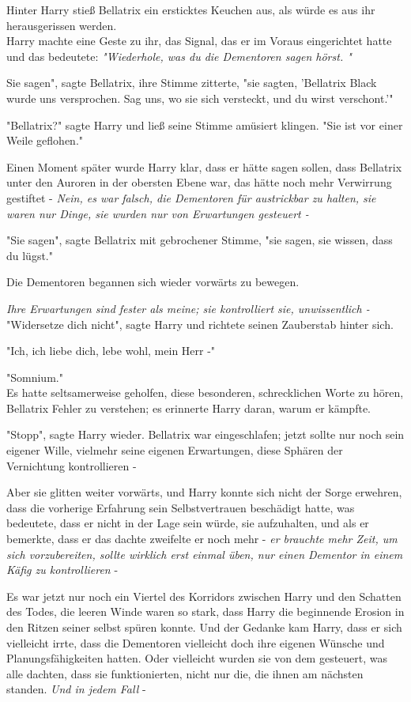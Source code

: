 {Hinter Harry stieß Bellatrix ein ersticktes Keuchen aus, als würde es aus ihr herausgerissen werden.\\ Harry machte eine Geste zu ihr, das Signal, das er im Voraus eingerichtet hatte und das bedeutete: \emph{"Wiederhole, was du die Dementoren sagen hörst. "}

Sie sagen", sagte Bellatrix, ihre Stimme zitterte, "sie sagten, 'Bellatrix Black wurde uns versprochen. Sag uns, wo sie sich versteckt, und du wirst verschont.'"

"Bellatrix?" sagte Harry und ließ seine Stimme amüsiert klingen. "Sie ist vor einer Weile geflohen."

Einen Moment später wurde Harry klar, dass er hätte sagen sollen, dass Bellatrix unter den Auroren in der obersten Ebene war, das hätte noch mehr Verwirrung gestiftet - \emph{Nein, es war falsch, die Dementoren für austrickbar zu halten, sie waren nur Dinge, sie wurden nur von Erwartungen gesteuert -}

"Sie sagen", sagte Bellatrix mit gebrochener Stimme, "sie sagen, sie wissen, dass du lügst."

Die Dementoren begannen sich wieder vorwärts zu bewegen.

\emph{Ihre Erwartungen sind fester als meine; sie kontrolliert sie, unwissentlich -}\\ "Widersetze dich nicht", sagte Harry und richtete seinen Zauberstab hinter sich.

"Ich, ich liebe dich, lebe wohl, mein Herr -"

"Somnium."\\ Es hatte seltsamerweise geholfen, diese besonderen, schrecklichen Worte zu hören, Bellatrix Fehler zu verstehen; es erinnerte Harry daran, warum er kämpfte.

"Stopp", sagte Harry wieder. Bellatrix war eingeschlafen; jetzt sollte nur noch sein eigener Wille, vielmehr seine eigenen Erwartungen, diese Sphären der Vernichtung kontrollieren -

Aber sie glitten weiter vorwärts, und Harry konnte sich nicht der Sorge erwehren, dass die vorherige Erfahrung sein Selbstvertrauen beschädigt hatte, was bedeutete, dass er nicht in der Lage sein würde, sie aufzuhalten, und als er bemerkte, dass er das dachte zweifelte er noch mehr - \emph{er brauchte mehr Zeit, um sich vorzubereiten, sollte wirklich erst einmal üben, nur einen Dementor in einem Käfig zu kontrollieren} -

Es war jetzt nur noch ein Viertel des Korridors zwischen Harry und den Schatten des Todes, die leeren Winde waren so stark, dass Harry die beginnende Erosion in den Ritzen seiner selbst spüren konnte. Und der Gedanke kam Harry, dass er sich vielleicht irrte, dass die Dementoren vielleicht doch ihre eigenen Wünsche und Planungsfähigkeiten hatten. Oder vielleicht wurden sie von dem gesteuert, was alle dachten, dass sie funktionierten, nicht nur die, die ihnen am nächsten standen. \emph{Und in jedem Fall} -

}
